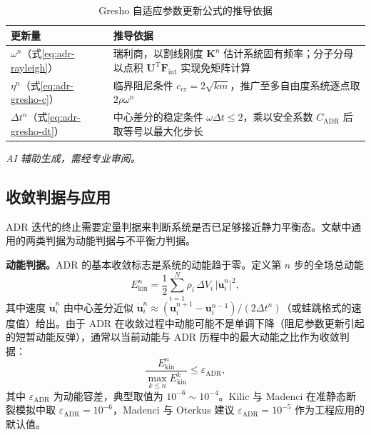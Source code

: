 \begin{table}[htbp]
  \centering
  \small
  \caption{Gresho 自适应参数更新公式的推导依据}
  \label{tab:adr-gresho}
  \begin{tabular}{>{\raggedright\arraybackslash}p{}>{\raggedright\arraybackslash}p{}}
    \toprule
    更新量 & 推导依据 \\
    \midrule
    $\omega^{n}$（式\eqref{eq:adr-rayleigh}） & 瑞利商，以割线刚度 $\mathbf{K}^{n}$ 估计系统固有频率；分子分母以点积 $\mathbf{U}^{\mathrm{T}}\mathbf{F}_{\mathrm{int}}$ 实现免矩阵计算 \\
    $\eta^{n}$（式\eqref{eq:adr-gresho-c}） & 临界阻尼条件 $c_{\text{cr}}=2\sqrt{km}$，推广至多自由度系统逐点取 $2\rho\omega^{n}$ \\
    $\Delta t^{n}$（式\eqref{eq:adr-gresho-dt}） & 中心差分的稳定条件 $\omega\Delta t\le2$，乘以安全系数 $C_{\text{ADR}}$ 后取等号以最大化步长 \\
    \bottomrule
  \end{tabular}
\end{table}

\emph{AI 辅助生成，需经专业审阅。}

\subsection{收敛判据与应用}\label{sec:adr-convergence}

ADR 迭代的终止需要定量判据来判断系统是否已足够接近静力平衡态。文献中通用的两类判据为动能判据与不平衡力判据。

\textbf{动能判据。}ADR 的基本收敛标志是系统的动能趋于零。定义第 $n$ 步的全场总动能
\begin{equation}
  E_{\text{kin}}^{n}
  =\frac{1}{2}\sum_{i=1}^{N}\rho_i\,\Delta V_i\,
  \lvert\dot{\mathbf{u}}_i^{n}\rvert^{2},
  \label{eq:adr-kinetic}
\end{equation}
其中速度 $\dot{\mathbf{u}}_i^{n}$ 由中心差分近似 $\dot{\mathbf{u}}_i^{n}\approx(\mathbf{u}_i^{n+1}-\mathbf{u}_i^{n-1})/(2\Delta t^{n})$（或蛙跳格式的速度值）给出。由于 ADR 在收敛过程中动能可能不是单调下降（阻尼参数更新引起的短暂动能反弹），通常以当前动能与 ADR 历程中的最大动能之比作为收敛判据：
\begin{equation}
  \frac{E_{\text{kin}}^{n}}{\displaystyle\max_{k\le n}E_{\text{kin}}^{k}}
  \le \varepsilon_{\text{ADR}},
  \label{eq:adr-convergence-kinetic}
\end{equation}
其中 $\varepsilon_{\text{ADR}}$ 为动能容差，典型取值为 $10^{-6}\sim10^{-4}$。Kilic 与 Madenci \cite{KilicMadenci2010} 在准静态断裂模拟中取 $\varepsilon_{\text{ADR}}=10^{-6}$，Madenci 与 Oterkus \cite{MadenciOterkus2014} 建议 $\varepsilon_{\text{ADR}}=10^{-5}$ 作为工程应用的默认值。

